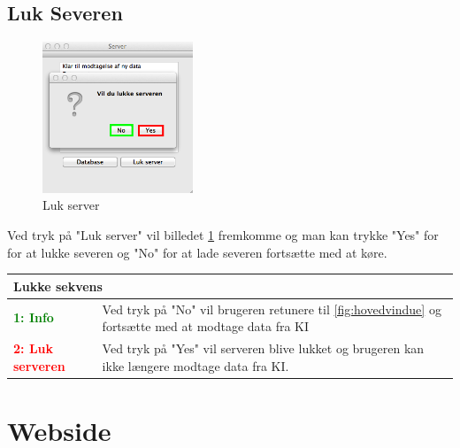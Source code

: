 \subsection*{Luk Severen}
\begin{figure}[H]
	\centering
	\includegraphics[width=0.4\textwidth]{billeder/database/databaseLogOff}
	\caption{Luk server}
	\label{fig:databselLogOff}
\end{figure}
Ved tryk på "Luk server" vil billedet \ref{fig:databselLogOff} fremkomme og man kan trykke "Yes" for for at lukke severen og "No" for at lade severen fortsætte med at køre.

\begin{table}[H]
\begin{tabular}{l p{12.5cm}}
\multicolumn{2}{l}{Lukke sekvens} \\
\hline
\textcolor{green}{\textbf{1: Info}}
&Ved tryk på "No" vil brugeren retunere til \ref{fig:hovedvindue} og fortsætte med at modtage data fra KI\\

\textcolor{red}{\textbf{2: Luk serveren}}
&Ved tryk på "Yes" vil serveren blive lukket og brugeren kan ikke længere modtage data fra KI.\\

\end{tabular}
\end{table}


\section*{Webside}
